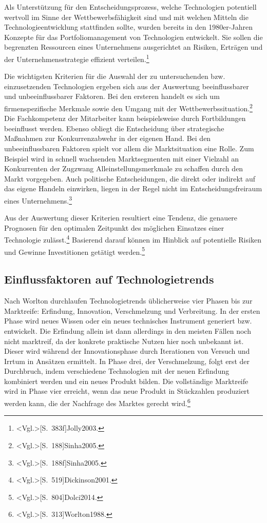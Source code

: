 Als Unterstützung für den Entscheidungsprozess, welche Technologien potentiell wertvoll im Sinne der Wettbewerbsfähigkeit sind und mit welchen Mitteln die Technologieentwicklung stattfinden sollte, wurden bereits in den 1980er-Jahren Konzepte für das Portfoliomanagement von Technologien entwickelt. Sie sollen die begrenzten Ressourcen eines Unternehmens ausgerichtet an Risiken, Erträgen und der Unternehmensstrategie effizient verteilen.\footnote{\citeNP<Vgl.>[S.~383f]{Jolly2003}.} 

Die wichtigsten Kriterien für die Auswahl der zu untersuchenden bzw. einzusetzenden Technologien ergeben sich aus der Auswertung beeinflussbarer und unbeeinflussbarer Faktoren. Bei den ersteren handelt es sich um firmenspezifische Merkmale sowie den Umgang mit der Wettbewerbssituation.\footnote{\citeNP<Vgl.>[S.~188]{Sinha2005}.} Die Fachkompetenz der Mitarbeiter kann beispielsweise durch Fortbildungen beeinflusst werden. Ebenso obliegt die Entscheidung über strategische Maßnahmen zur Konkurrenzabwehr in der eigenen Hand. Bei den unbeeinflussbaren Faktoren spielt vor allem die Marktsituation eine Rolle. Zum Beispiel wird in schnell wachsenden Marktsegmenten mit einer Vielzahl an Konkurrenten der Zugzwang Alleinstellungsmerkmale zu schaffen durch den Markt vorgegeben. Auch politische Entscheidungen, die direkt oder indirekt auf das eigene Handeln einwirken, liegen in der Regel nicht im Entscheidungsfreiraum eines Unternehmens.\footnote{\citeNP<Vgl.>[S.~188f]{Sinha2005}.}

Aus der Auswertung dieser Kriterien resultiert eine Tendenz, die genauere Prognosen für den optimalen Zeitpunkt des möglichen Einsatzes einer Technologie zulässt.\footnote{\citeNP<Vgl.>[S.~519]{Dickinson2001}.} Basierend darauf können im Hinblick auf potentielle Risiken und Gewinne Investitionen getätigt werden.\footnote{\citeNP<Vgl.>[S.~804]{Dolci2014}.}

\subsection{Einflussfaktoren auf Technologietrends}
Nach Worlton durchlaufen Technologietrends üblicherweise vier Phasen bis zur Marktreife: Erfindung, Innovation, Verschmelzung und Verbreitung. In der ersten Phase wird neues Wissen oder ein neues technisches Instrument generiert bzw. entwickelt. Die Erfindung allein ist dann allerdings in den meisten Fällen noch nicht marktreif, da der konkrete praktische Nutzen hier noch unbekannt ist. Dieser wird während der Innovationsphase durch Iterationen von Versuch und Irrtum in Ansätzen ermittelt. In Phase drei, der Verschmelzung, folgt erst der Durchbruch, indem verschiedene Technologien mit der neuen Erfindung kombiniert werden und ein neues Produkt bilden. Die vollständige Marktreife wird in Phase vier erreicht, wenn das neue Produkt in Stückzahlen produziert werden kann, die der Nachfrage des Marktes gerecht wird.\footnote{\citeNP<Vgl.>[S.~313]{Worlton1988}.}

